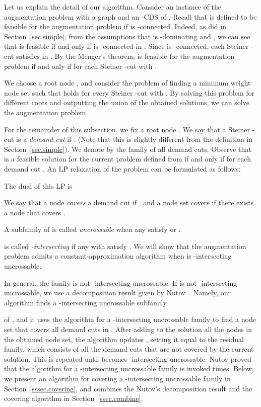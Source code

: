 \documentclass[11pt]{article}
\begin{document}
Let us explain the detail of our algorithm.
Consider an instance of the augmentation problem with a graph 
and an -CDS  of .
Recall that  is defined to be feasible for the augmentation
problem
if  is -connected.
Indeed,
as did in Section~\ref{sec.simple},
from the assumptions that  is -dominating and ,
we can see that  is feasible if and only if
 is -connected in
.
Since  is -connected,
each Steiner -cut  satisfies  in .
By the Menger's theorem,  is feasible for the augmentation problem
if and only if  for 
each Steiner -cut  with .

We choose a root node , and consider
the problem of finding a minimum weight node set
 such that
 holds for 
every Steiner -cut  with .
By solving this problem for different  roots and
outputting the union of the obtained solutions,
we can solve the augmentation problem.

 For the remainder of this subsection, we fix a root node .
We say that a Steiner -cut  is a \emph{demand cut}
if .
 (Note that this is slightly different from the definition in
 Section~\ref{sec.simple}).
We denote by  the family of all demand cuts.
 Observe that  is a feasible solution for the current problem defined
 from 
 if and only if  for each demand cut .
An LP relaxation of the problem can be formulated as follows:

The dual of this LP is 

We say that
a node  
\emph{covers} a demand cut 
if ,
and a node set 
covers  if there exists a node  that covers .



A subfamily  of  is called \emph{uncrossable} when 
any 
satisfy  or
.

is called \emph{-intersecting}
 if
any 
with  satisfy .
We will show that the augmentation problem admits  a
constant-approximation algorithm when  is -intersecting uncrossable.

In general, the family  is not -intersecting uncrossable.
If  is not -intersecting uncrossable, 
we use a decomposition result given by Nutov~\cite{Nutov12}.
Namely, our algorithm finds a -intersecting uncrossable subfamily

of ,
and it uses the algorithm for a -intersecting uncrossable family to find a node set that covers all demand cuts in .
After adding to the solution all the nodes in the obtained node set,
the algorithm updates , setting it equal to the residual family, which consists of all the demand
cuts that are not
covered by the current solution.
This is repeated until  becomes -intersecting uncrossable.
Nutov proved that the algorithm for a -intersecting uncrossable family is invoked
 times.
Below,
we present an algorithm for
covering a -intersecting uncrossable family in Section~\ref{sssec.covering}, and
combines the Nutov's decomposition result and the covering algorithm in Section~\ref{ssec.combine}.
\end{document}
